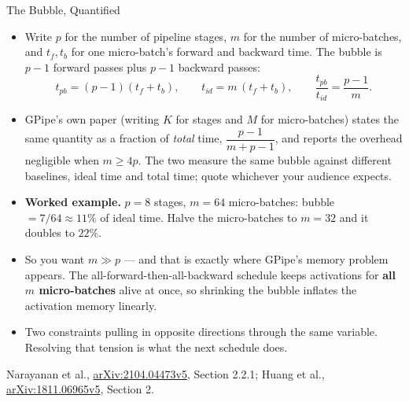 \begin{frame}[allowframebreaks]{The Bubble, Quantified}
  \begin{itemize}\itemsep0.35em
    \item[\textcolor{red}{$\blacktriangleright$}] Write $p$ for the number of pipeline stages, $m$ for the number of micro-batches, and $t_f, t_b$ for one micro-batch's forward and backward time. The bubble is $p-1$ forward passes plus $p-1$ backward passes:
      \[
        t_{pb} = (p-1)(t_f + t_b), \qquad t_{id} = m\,(t_f + t_b),
        \qquad \frac{t_{pb}}{t_{id}} = \boxed{\frac{p-1}{m}}.
      \]
    \item[\textcolor{red}{$\blacktriangleright$}] GPipe's own paper (writing $K$ for stages and $M$ for micro-batches) states the same quantity as a fraction of \emph{total} time, $\dfrac{p-1}{m+p-1}$, and reports the overhead negligible when $m \geq 4p$. The two measure the same bubble against different baselines, ideal time and total time; quote whichever your audience expects.
    \item[\textcolor{red}{$\blacktriangleright$}] \textbf{Worked example.} $p = 8$ stages, $m = 64$ micro-batches: bubble $= 7/64 \approx 11\%$ of ideal time. Halve the micro-batches to $m = 32$ and it doubles to $22\%$.
    \item[\textcolor{red}{$\blacktriangleright$}] So you want $m \gg p$ --- and that is exactly where GPipe's memory problem appears. The all-forward-then-all-backward schedule keeps activations for \textbf{all $m$ micro-batches} alive at once, so shrinking the bubble inflates the activation memory linearly.
    \item[\textcolor{red}{$\blacktriangleright$}] Two constraints pulling in opposite directions through the same variable. Resolving that tension is what the next schedule does.
  \end{itemize}
  \vspace{0.1em}
  {\scriptsize Narayanan et al., \href{https://arxiv.org/abs/2104.04473v5}{arXiv:2104.04473v5}, Section 2.2.1; Huang et al., \href{https://arxiv.org/abs/1811.06965v5}{arXiv:1811.06965v5}, Section 2.}
\end{frame}

